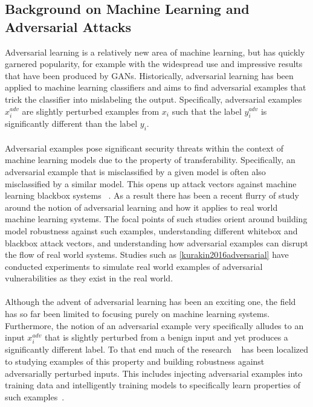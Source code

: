 \documentclass[letterpaper,twocolumn,10pt]{article}
\begin{document}
\subsection{Background on Machine Learning and Adversarial Attacks} 
Adversarial learning is a relatively new area of machine learning, but has quickly garnered popularity, for example with the widespread use and impressive results that have been produced by GANs. Historically, adversarial learning has been applied to machine learning classifiers and aims to find adversarial examples that trick the classifier into mislabeling the output. Specifically, adversarial examples $x^{adv}_{i}$ are slightly perturbed examples from $x_{i}$ such that the label $y^{adv}_{i}$ is significantly different than the label $y_{i}$. 
\\
\\
Adversarial examples pose significant security threats within the context of machine learning models due to the property of transferability. Specifically, an adversarial example that is misclassified by a given model is often also misclassified by a similar model. This opens up attack vectors against machine learning blackbox systems ~\cite{papernot2017practical}. As a result there has been a recent flurry of study around the notion of adversarial learning and how it applies to real world machine learning systems. The focal points of such studies orient around building model robustness against such examples, understanding different whitebox and blackbox attack vectors, and understanding how adversarial examples can disrupt the flow of real world systems. Studies such as \ref{kurakin2016adversarial} have conducted experiments to simulate real world examples of adversarial vulnerabilities as they exist in the real world. 
\\
\\
Although the advent of adversarial learning has been an exciting one, the field has so far been limited to focusing purely on machine learning systems. Furthermore, the notion of an adversarial example very specifically alludes to an input $x^{adv}_{i}$ that is slightly perturbed from a benign input and yet produces a significantly different label. To that end much of the research ~\cite{su2019one, tramer2017ensemble, athalye2018obfuscated} has been localized to studying examples of this property and building robustness against adversarially perturbed inputs. This includes injecting adversarial examples into training data and intelligently training models to specifically learn properties of such examples~\cite{huang2011adversarial}.
\end{document}
